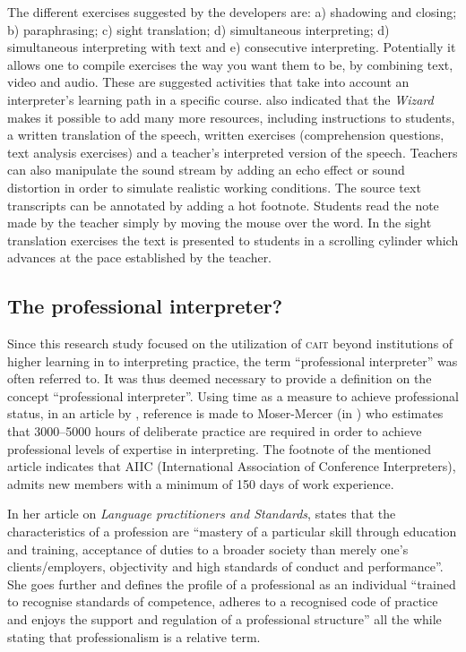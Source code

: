 \documentclass[output=paper]{langsci/langscibook}
\begin{document}
The different exercises suggested by the developers are: a) shadowing and closing; b) paraphrasing; c) sight translation; d) simultaneous interpreting; d) simultaneous interpreting with text and e) consecutive interpreting. Potentially it allows one to compile exercises the way you want them to be, by combining text, video and audio. These are suggested activities that take into account an interpreter’s learning path in a specific course. \citet[10]{Sandrelli2007a} also indicated that the \textit{Wizard} makes it possible to add many more resources, including instructions to students, a written translation of the speech, written exercises (comprehension questions, text analysis exercises) and a teacher’s interpreted version of the speech. Teachers can also manipulate the sound stream by adding an echo effect or sound distortion in order to simulate realistic working conditions. The source text transcripts can be annotated by adding a hot footnote. Students read the note made by the teacher simply by moving the mouse over the word. In the sight translation exercises the text is presented to students in a scrolling cylinder which advances at the pace established by the teacher. 

\subsection{The professional interpreter?}
Since this research study focused on the utilization of \textsc{cait} beyond institutions of higher learning in to interpreting practice, the term “professional interpreter” was often referred to. It was thus deemed necessary to provide a definition on the concept “professional interpreter”. Using time as a measure to achieve professional status, in an article by \citet[115]{Sandrelli2015}, reference is made to Moser-Mercer (in \citealt{Motta2006}) who estimates that 3000--5000 hours of deliberate practice are required in order to achieve professional levels of expertise in interpreting. The footnote of the mentioned article indicates that AIIC (International Association of Conference Interpreters), admits new members with a minimum of 150 days of work experience.

In her article on \textit{Language practitioners and Standards}, \citet[162]{Feinauer2005} states that the characteristics of a profession are “mastery of a particular skill through education and training, acceptance of duties to a broader society than merely one’s clients/employers, objectivity and high standards of conduct and performance”. She goes further and defines the profile of a professional as an individual “trained to recognise standards of competence, adheres to a recognised code of practice and enjoys the support and regulation of a professional structure” all the while stating that professionalism is a relative term. 
\end{document}

